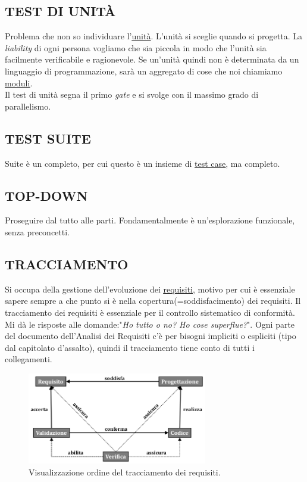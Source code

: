 	
		\subsection{TEST DI UNITÀ}		\label{testunita}
		Problema che non so individuare l'\underline{\hyperref[unita]{unità}}. L'unità si sceglie quando si progetta. La \textit{liability} di ogni persona vogliamo che sia piccola in modo che l'unità sia facilmente verificabile e ragionevole. Se un'unità quindi non è determinata da un linguaggio di programmazione, sarà un aggregato di cose che noi chiamiamo \underline{\hyperref[moduli]{moduli}}.	\\
		Il test di unità segna il primo \textit{gate} e si svolge con il massimo grado di parallelismo.
				
		
		\subsection{TEST SUITE}		\label{testsuite}
		Suite è un completo, per cui questo è un insieme di \underline{\hyperref[testcase]{test case}}, ma completo.
				
		
		\subsection{TOP-DOWN}	 \label{topdown}
		Proseguire dal tutto alle parti. Fondamentalmente è un'esplorazione funzionale, senza preconcetti.
		
	
		\subsection{TRACCIAMENTO}  \label{tracciamento}
		Si occupa della gestione dell'evoluzione dei \underline{\hyperref[requirements]{requisiti}}, motivo per cui è essenziale sapere sempre a che punto si è nella copertura(=soddisfacimento) dei requisiti. Il tracciamento dei requisiti è essenziale per il controllo sistematico di conformità. Mi dà le risposte alle domande:"\textit{Ho tutto o no? Ho cose superflue?}". Ogni parte del documento dell'Analisi dei Requisiti c'è per bisogni impliciti o espliciti (tipo dal capitolato d'assalto), quindi il tracciamento tiene conto di tutti i collegamenti.
		
		\begin{figure}[H]
			\centering
			\includegraphics[width=0.7\textwidth]{img/trac}		
			\caption{Visualizzazione ordine del tracciamento dei requisiti.}
		\end{figure} 
	
